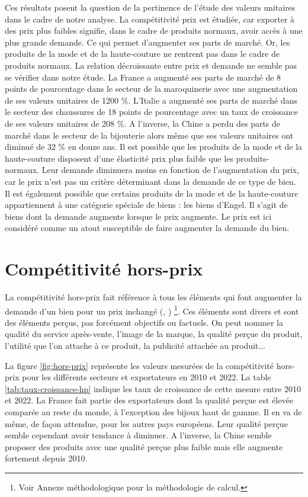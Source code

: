 \documentclass[french,10pt,a4paper]{article}
\begin{document}
Ces résultats posent la question de la pertinence de l'étude des valeurs unitaires dans le cadre de notre analyse. La compétitivité prix est étudiée, car exporter à des prix plus faibles signifie, dans le cadre de \og produits normaux\fg{}, avoir accès à une plus grande demande. Ce qui permet d'augmenter ses parts de marché. Or, les produits de la mode et de la haute-couture ne rentrent pas dans le cadre de \og produits normaux\fg{}. La relation décroissante entre prix et demande ne semble pas se vérifier dans notre étude. La France a augmenté ses parts de marché de 8 points de pourcentage dans le secteur de la maroquinerie avec une augmentation de ses valeurs unitaires de 1200 \%. L'Italie a augmenté ses parts de marché dans le secteur des chaussures de 18 points de pourcentage avec un taux de croissance de ses valeurs unitaires de 208 \%. A l'inverse, la Chine a perdu des parts de marché dans le secteur de la bijouterie alors même que ses valeurs unitaires ont diminué de 32 \% en douze ans. Il est possible que les produits de la mode et de la haute-couture disposent d'une élasticité prix plus faible que les \og produits-normaux\fg{}. Leur demande diminuera moins en fonction de l'augmentation du prix, car le prix n'est pas un critère déterminant dans la demande de ce type de bien. Il est également possible que certains produits de la mode et de la haute-couture appartiennent à une catégorie spéciale de biens : les \og biens d'Engel\fg{}. Il s'agit de biens dont la demande augmente lorsque le prix augmente. Le prix est ici considéré comme un atout susceptible de faire augmenter la demande du bien.  


\section{Compétitivité hors-prix}
La compétitivité hors-prix fait référence à tous les éléments qui font augmenter la demande d'un bien pour un prix inchangé (\cite{Khandelwal2013}, \cite{Bas2015}) \footnote{Voir Annexe méthodologique pour la méthodologie de calcul.}. Ces éléments sont divers et sont des éléments perçus, pas forcément objectifs ou factuels. On peut nommer la qualité du service après-vente, l'image de la marque, la qualité perçue du produit, l'utilité que l'on attache à ce produit, la publicité attachée au produit...  

La figure \ref{fig:hors-prix} représente les valeurs mesurées de la compétitivité hors-prix pour les différents secteurs et exportateurs en 2010 et 2022. La table \ref{tab:taux-croissance-hp} indique les taux de croissance de cette mesure entre 2010 et 2022. La France fait partie des exportateurs dont la qualité perçue est élevée comparée au reste du monde, à l'exception des bijoux haut de gamme. Il en va de même, de façon attendue, pour les autres pays européens. Leur qualité perçue semble cependant avoir tendance à diminuer. A l'inverse, la Chine semble proposer des produits avec une qualité perçue plus faible mais elle augmente fortement depuis 2010.
\end{document}

